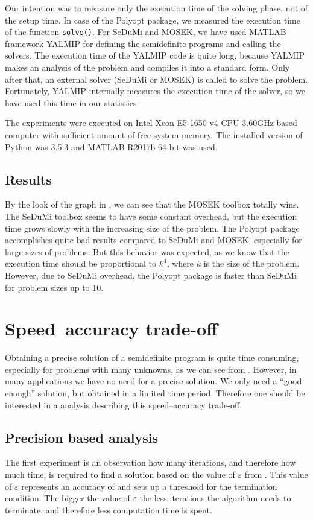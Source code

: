 Our intention was to measure only the execution time of the solving phase, not of the setup time.
In case of the Polyopt package, we measured the execution time of the function \texttt{solve()}.
For SeDuMi and MOSEK, we have used MATLAB framework YALMIP \cite{yalmip} for defining the semidefinite programs and calling the solvers.
The execution time of the YALMIP code is quite long, because YALMIP makes an analysis of the problem and compiles it into a standard form.
Only after that, an external solver (SeDuMi or MOSEK) is called to solve the problem.
Fortunately, YALMIP internally measures the execution time of the solver, so we have used this time in our statistics.

The experiments were executed on Intel Xeon E5-1650 v4 CPU 3.60GHz based computer with sufficient amount of free system memory.
The installed version of Python was 3.5.3 and MATLAB R2017b 64-bit was used.

\subsection{Results}
By the look of the graph in , we can see that the MOSEK toolbox totally wins.
The SeDuMi toolbox seems to have some constant overhead, but the execution time grows slowly with the increasing size of the problem.
The Polyopt package accomplishes quite bad results compared to SeDuMi and MOSEK, especially for large sizes of problems.
But this behavior was expected, as we know that the execution time should be proportional to $k^4$, where $k$ is the size of the problem.
However, due to SeDuMi overhead, the Polyopt package is faster than SeDuMi for problem sizes up to 10.

\section{Speed--accuracy trade-off}
Obtaining a precise solution of a semidefinite program is quite time consuming, especially for problems with many unknowns, as we can see from .
However, in many applications we have no need for a precise solution.
We only need a ``good enough'' solution, but obtained in a limited time period.
Therefore one should be interested in a analysis describing this speed--accuracy trade-off.

\subsection{Precision based analysis}

The first experiment is an observation how many iterations, and therefore how much time, is required to find a solution based on the value of $\varepsilon$ from .
This value of $\varepsilon$ represents an accuracy of  and sets up a threshold for the termination condition.
The bigger the value of $\varepsilon$ the less iterations the algorithm needs to terminate, and therefore less computation time is spent.

